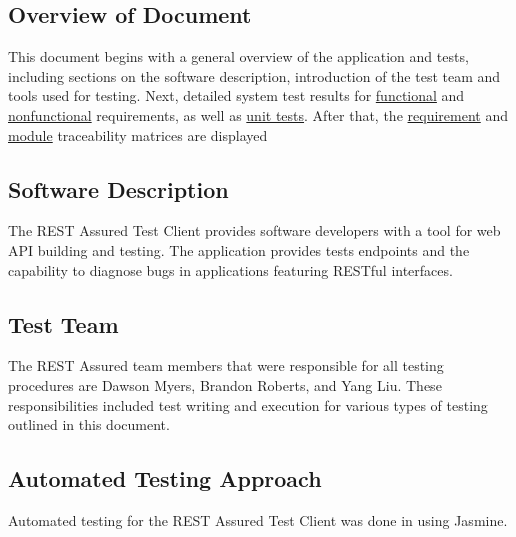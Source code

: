 \documentclass[12pt, titlepage]{article}
\begin{document}
\subsection{Overview of Document}
This document begins with a general overview of the application and tests, including sections on the software description, introduction of the test team and tools used for testing. Next, detailed system test results for \hyperref[tests:frt:ui]{functional} and \hyperref[tests:nrt:per]{nonfunctional} requirements, as well as  \hyperref[tests:unittest]{unit tests}. After that, the \hyperref[trace:req]{requirement} and \hyperref[trace:module]{module} traceability matrices are displayed


\subsection{Software Description}
The REST Assured Test Client provides software developers with a tool for web API building and testing. The application provides tests endpoints and the capability to diagnose bugs in applications featuring RESTful interfaces. 

\subsection{Test Team}
The REST Assured team members that were responsible for all testing procedures are Dawson Myers, Brandon Roberts, and Yang Liu. These responsibilities included test writing and execution for various types of testing outlined in this document.

\subsection{Automated Testing Approach}
Automated testing for the REST Assured Test Client was done in using Jasmine.
\end{document}
